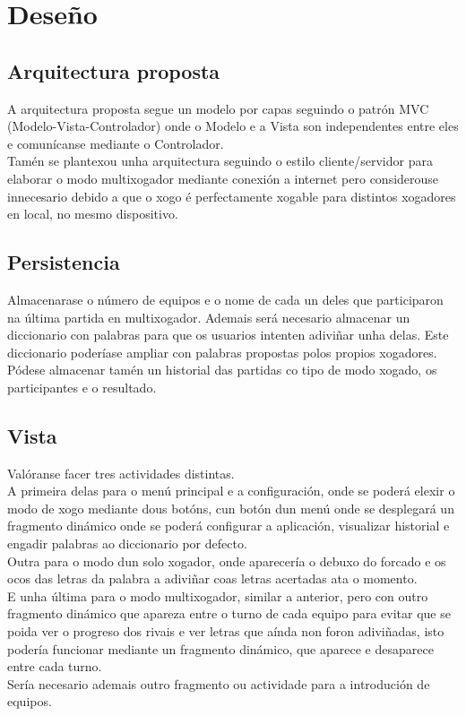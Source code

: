 \chapter{Deseño}
\label{chap:deseño}
\section {Arquitectura proposta}
A arquitectura proposta segue un modelo por capas seguindo o patrón MVC (Modelo-Vista-Controlador) onde o Modelo e a Vista son independentes entre eles e comunícanse mediante o Controlador.\\

Tamén se plantexou unha arquitectura seguindo o estilo cliente/servidor para elaborar o modo multixogador mediante conexión a internet pero considerouse innecesario debido a que o xogo é perfectamente xogable para distintos xogadores en local, no mesmo dispositivo.


\section {Persistencia}
Almacenarase o número de equipos e o nome de cada un deles que participaron na última partida en multixogador.
Ademais será necesario almacenar un diccionario con palabras para que os usuarios intenten adiviñar unha delas. Este diccionario poderíase ampliar con palabras propostas polos propios xogadores.
Pódese almacenar tamén un historial das partidas co tipo de modo xogado, os participantes e o resultado.

\section {Vista}
Valóranse facer tres actividades distintas.\\
A primeira delas para o menú principal e a configuración, onde se poderá elexir o modo de xogo mediante dous botóns, cun botón dun menú onde se desplegará un fragmento dinámico onde se poderá configurar a aplicación, visualizar historial e engadir palabras ao diccionario por defecto.\\

Outra para o modo dun solo xogador, onde aparecería o debuxo do forcado e os ocos das letras da palabra a adiviñar coas letras acertadas ata o momento.\\

E unha última para o modo multixogador, similar a anterior, pero con outro fragmento dinámico que apareza entre o turno de cada equipo para evitar que se poida ver o progreso dos rivais e ver letras que aínda non foron adiviñadas, isto podería funcionar mediante un fragmento dinámico, que aparece e desaparece entre cada turno.\\
Sería necesario ademais outro fragmento ou actividade para a introdución de equipos.

